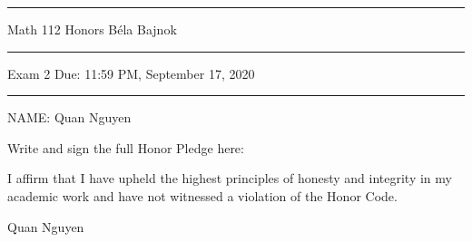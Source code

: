 \documentclass[12pt]{article}
\begin{document}
\hrule
\vspace{.2cm}

{\Large \noindent Math 112 Honors
\hfill
B\'ela Bajnok}

\vspace{.3cm}
\hrule

{\Large \noindent 
Exam 2
\hfill
Due: 11:59 PM, September 17, 2020}

\vspace{.3cm}
\hrule

\noindent NAME:  Quan Nguyen

\noindent \hrulefill\rule{0pt}{4pt}

\noindent Write and sign the full Honor Pledge here:

\vspace{2mm}

I affirm that I have upheld the highest principles of honesty and integrity in my academic work and have not witnessed a violation of the Honor Code. \par

Quan Nguyen

\vspace{8mm}

\noindent \hrulefill\rule{0pt}{4pt}

\end{document}
